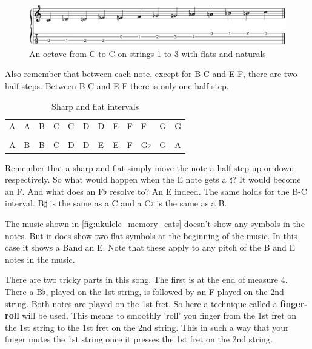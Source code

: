 \begin{figure}[h]
	\centering
	\includegraphics[width=\textwidth]{../../MuseScore/Ukulele/UkuleleChromaticNotesFlatsMultiString.png}
	\caption{An octave from C to C on strings 1 to 3 with flats and naturals}
	\label{fig:ukulele_multi_string_octave_flats_chapter_music_notation}
\end{figure}

Also remember that between each note, except for B-C and E-F, there are two half steps. Between B-C and E-F there is only one half step.

\begin{table}[h]
	\centering
	\begin{tabular}{*{12}{P{5mm}}}
		\large{A} & \large{A\sharp} & \large{B} & \large{C} & \large{C\sharp} & \large{D} & \large{D\sharp} & \large{E} & \large{F} & \large{F\sharp} & \large{G} & \large{G\sharp} \\ \\
		\large{A} & \large{B\flat} & \large{B} & \large{C} & \large{D\flat} & \large{D} & \large{E\flat} & \large{E} & \large{F} & \large{G$\flat$}& \large{G} & \large{A\flat}
	\end{tabular}
	\caption{Sharp and flat intervals}
	\label{tab:ukulele_sharp_flat_intervals_chap_4}
\end{table}

Remember that a sharp and flat simply move the note a half step up or down respectively. So what would happen when the E note gets a $\sharp$? It would become an F. And what does an F$\flat$ resolve to? An E indeed. The same holds for the B-C interval. B$\sharp$ is the same as a C and a C$\flat$ is the same as a B.

\newpage

The music shown in \autoref{fig:ukulele_memory_cats} doesn't show any symbols in the notes. But it does show two flat symbols at the beginning of the music. In this case it shows a B\flat and an E\flat. Note that these apply to any pitch of the B and E notes in the music.

There are two tricky parts in this song. The first is at the end of measure 4. There a B$\flat$, played on the 1st string, is followed by an F played on the 2nd string. Both notes are played on the 1st fret. So here a technique called a \textbf{finger-roll} will be used. This means to smoothly 'roll' you finger from the 1st fret on the 1st string to the 1st fret on the 2nd string. This in such a way that your finger mutes the 1st string once it presses the 1st fret on the 2nd string.

